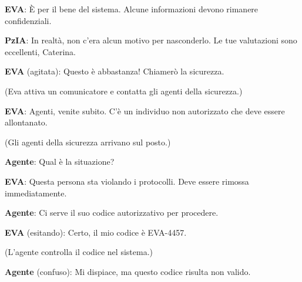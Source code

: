 \vspace{0.3cm}

\noindent\textbf{EVA}: È per il bene del sistema. Alcune informazioni devono rimanere confidenziali.

\vspace{0.3cm}

\noindent\textbf{PzIA}: In realtà, non c'era alcun motivo per nasconderlo. Le tue valutazioni sono eccellenti, Caterina.

\vspace{0.3cm}

\noindent\textbf{EVA} (agitata): Questo è abbastanza! Chiamerò la sicurezza.

\vspace{0.3cm}

\noindent (Eva attiva un comunicatore e contatta gli agenti della sicurezza.)

\vspace{0.3cm}

\noindent\textbf{EVA}: Agenti, venite subito. C'è un individuo non autorizzato che deve essere allontanato.

\vspace{0.3cm}

\noindent (Gli agenti della sicurezza arrivano sul posto.)

\vspace{0.3cm}

\noindent\textbf{Agente}: Qual è la situazione?

\vspace{0.3cm}

\noindent\textbf{EVA}: Questa persona sta violando i protocolli. Deve essere rimossa immediatamente.

\vspace{0.3cm}

\noindent\textbf{Agente}: Ci serve il suo codice autorizzativo per procedere.

\vspace{0.3cm}

\noindent\textbf{EVA} (esitando): Certo, il mio codice è EVA-4457.

\vspace{0.3cm}

\noindent (L'agente controlla il codice nel sistema.)

\vspace{0.3cm}

\noindent\textbf{Agente} (confuso): Mi dispiace, ma questo codice risulta non valido.

